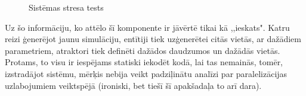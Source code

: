 \begin{figure}[H]%
    \centering
    \qquad
    \caption{Sistēmas stresa tests}
    \label{img:test-single-vs-mutlicore}%
\end{figure}

Uz šo informāciju, ko attēlo šī komponente ir jāvērtē tikai kā ,,ieskats". Katru
reizi ģenerējot jaunu simulāciju, entītiji tiek uzģenerētei citās vietās, ar
dažādiem parametriem, atraktori tiek definēti dažādos daudzumos un dažādās vietās.
Protams, to visu ir iespējams statiski iekodēt kodā, lai tas nemainās, tomēr,
izstradājot sistēmu, mērķis nebija veikt padziļinātu analīzi par paralelizācijas
uzlabojumiem veiktspējā (ironiski, bet tiešī šī apakšadaļa to arī dara).
